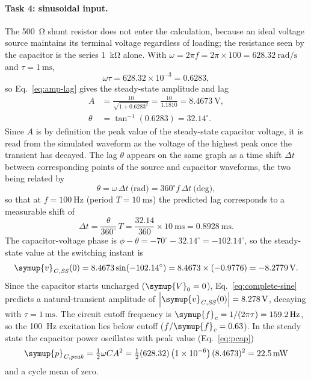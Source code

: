 \documentclass[12pt,a4paper]{article}
\begin{document}
	\paragraph{Task 4: sinusoidal input.}
	The \SI{500}{\ohm} shunt resistor does not enter the calculation,
	because an ideal voltage source maintains its terminal voltage
	regardless of loading; the resistance seen by the capacitor is the
	series \SI{1}{\kilo\ohm} alone.  With $\omega = 2\pi f = 2\pi \times
	100 = \SI{628.32}{\radian\per\second}$ and
	$\tau = \SI{1}{\milli\second}$,
	\begin{equation}
		\omega\tau = 628.32 \times 10^{-3} = 0.6283,
	\end{equation}
	so Eq.~\eqref{eq:amp-lag} gives the steady-state amplitude and lag
	\begin{align}
		A &= \frac{10}{\sqrt{1 + 0.6283^2}}
		= \frac{10}{1.1810} = \SI{8.4673}{\volt},\\
		\theta &= \tan^{-1}(0.6283) = 32.14^{\circ}.
	\end{align}
	Since $A$ is by definition the peak value of the steady-state
	capacitor voltage, it is read from the simulated waveform as the
	voltage of the highest peak once the transient has decayed.  The lag
	$\theta$ appears on the same graph as a time shift $\Delta t$ between
	corresponding points of the source and capacitor waveforms, the two
	being related by
	\begin{equation}
		\theta = \omega\,\Delta t \ \text{(rad)}
		= 360^{\circ} f\,\Delta t \ \text{(deg)},
		\label{eq:phase-shift}
	\end{equation}
	so that at $f = \SI{100}{\hertz}$ (period $T = \SI{10}{\milli\second}$)
	the predicted lag corresponds to a measurable shift of
	\begin{equation}
		\Delta t = \frac{\theta}{360^{\circ}}\,T
		= \frac{32.14}{360} \times \SI{10}{\milli\second}
		= \SI{0.8928}{\milli\second}.
	\end{equation}
	The capacitor-voltage phase is $\phi - \theta = -70^\circ - 32.14^\circ
	= -102.14^\circ$, so the steady-state value at the switching instant
	is
	\begin{equation}
		\symup{v}_{\mathit{C,SS}}(0) = 8.4673\sin(-102.14^{\circ})
		= 8.4673 \times (-0.9776) = \SI{-8.2779}{\volt}.
	\end{equation}
	Since the capacitor starts uncharged ($\symup{V}_{0} = 0$),
	Eq.~\eqref{eq:complete-sine} predicts a natural-transient amplitude
	of $\left|\symup{v}_{\mathit{C,SS}}(0)\right| = \SI{8.278}{\volt}$,
	decaying with $\tau = \SI{1}{\milli\second}$.  The circuit cutoff
	frequency is $\symup{f}_{\mathit{c}} = 1/(2\pi\tau) = \SI{159.2}{\hertz}$, so the
	\SI{100}{\hertz} excitation lies below cutoff
	($f/\symup{f}_{\mathit{c}} = 0.63$).  In the steady state the capacitor power
	oscillates with peak value (Eq.~\eqref{eq:pcap})
	\begin{equation}
		\symup{p}_{\mathit{C,peak}} = \tfrac{1}{2}\omega C A^{2}
		= \tfrac{1}{2}(628.32)\left(1\times10^{-6}\right)(8.4673)^2
		= \SI{22.5}{\milli\watt}
	\end{equation}
	and a cycle mean of zero.
	
\end{document}
